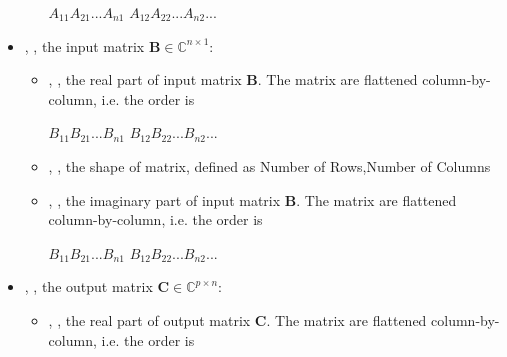 \begin{itemize}
\begin{itemize}
    \begin{math} A_{11} A_{21} ... A_{n1} \end{math} \begin{math}A_{12} A_{22} ... A_{n2} ... \end{math}
  \end{itemize}
  
  \item {}, , 
  the input matrix \begin{math} \textbf{B}\in\mathbb{C}^{n \times 1} \end{math}:
  \begin{itemize}
    \item {}, , 
    the real part of input matrix \begin{math} \textbf{B} \end{math}. The matrix are flattened 
    column-by-column, i.e. the order is 

    \begin{math} B_{11} B_{21} ... B_{n1} \end{math} \begin{math}B_{12} B_{22} ... B_{n2} ... \end{math}
    \item {}, , 
    the shape of matrix, defined as Number of Rows,Number of Columns
    \item {}, , 
    the imaginary part of input matrix \begin{math} \textbf{B} \end{math}. The matrix are flattened 
    column-by-column, i.e. the order is 

    \begin{math} B_{11} B_{21} ... B_{n1} \end{math} \begin{math}B_{12} B_{22} ... B_{n2} ... \end{math}
  \end{itemize}
  
  \item {}, , 
  the output matrix \begin{math} \textbf{C}\in\mathbb{C}^{p \times n} \end{math}:
  \begin{itemize}
    \item {}, , 
    the real part of output matrix \begin{math} \textbf{C} \end{math}. The matrix are flattened 
    column-by-column, i.e. the order is 


\end{itemize}
\end{itemize}
